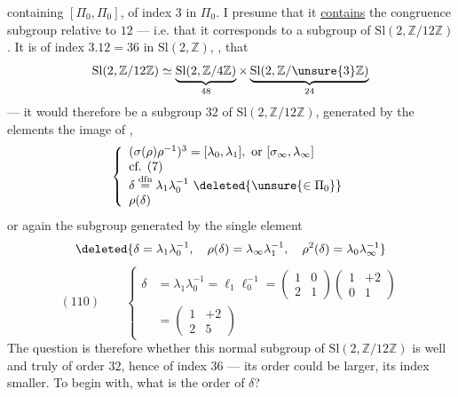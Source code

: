 containing $[\Pi_0,\Pi_0]$, of index $3$ in $\Pi_0$.
I presume that it  \uline{contains} the
congruence subgroup relative to $12$ --- i.e. that it corresponds to a
 subgroup of $\mathrm{Sl}(2,\mathbb Z/12\mathbb Z)$.
It is of index $3.12=36$ in $\mathrm{Sl}(2,\mathbb Z)$,
,
 that
\[
\mathrm{Sl}(2,\mathbb Z/12\mathbb Z)\simeq
\underbrace{\mathrm{Sl}(2,\mathbb Z/4\mathbb Z)}_{48}\times
\underbrace{\mathrm{Sl}(2,\mathbb Z/\unsure{3}\mathbb Z)}_{24}
\]
--- it would therefore be a subgroup \uline{}
$32$ of $\mathrm{Sl}(2,\mathbb Z/12\mathbb Z)$,
generated by the elements  the image of
\deleted{$[\sigma_\infty,\lambda_\infty]$},
\[
\left\{
\begin{array}{l}
(\sigma(\rho)\rho^{-1})^3=[\lambda_0,\lambda_1],\ \text{or }[\sigma_\infty,\lambda_\infty]\\
\text{cf. (7)}\\
\delta\overset{\mathrm{dfn}}{=}\lambda_1\lambda_0^{-1}
\ \deleted{\unsure{\in\Pi_0}}\\
\rho(\delta)
\end{array}
\right.
\]
or again the  subgroup generated by the single element
\[
\deleted{\delta=\lambda_1\lambda_0^{-1},\quad
\rho(\delta)=\lambda_\infty\lambda_1^{-1},\quad
\rho^2(\delta)=\lambda_0\lambda_\infty^{-1}}
\]
\[
(110)\qquad
\left\{
\begin{aligned}
\delta&=\lambda_1\lambda_0^{-1}=\ell_1\ell_0^{-1}
=\begin{pmatrix}1&0\\2&1\end{pmatrix}
 \begin{pmatrix}1&+2\\0&1\end{pmatrix}\\
&=\begin{pmatrix}1&+2\\2&5\end{pmatrix}
\end{aligned}
\right.
\]
The question is therefore whether this normal subgroup of
$\mathrm{Sl}(2,\mathbb Z/12\mathbb Z)$ is well and truly of order $32$,
hence of index $36$ --- its order could be larger, its index
smaller. To begin with, what is the order of $\delta$?


